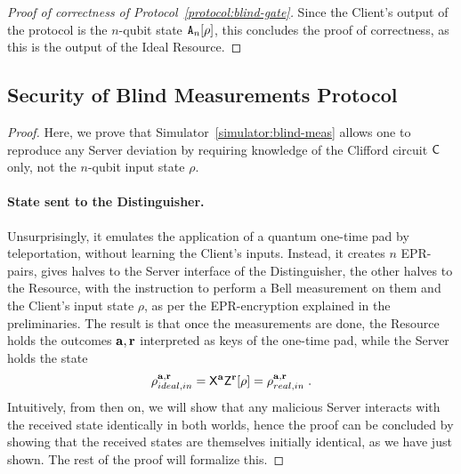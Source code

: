 \begin{proof}[Proof of correctness of Protocol~\ref{protocol:blind-gate}]
    Since the Client's output of the protocol is the $n$-qubit state $\mathtt{A}_n
        [\rho]$, this concludes the proof of correctness, as this is the output of the Ideal Resource.
\end{proof}

 \subsection{Security of Blind Measurements Protocol}
\label{section:blindmeas-secproof-formal}
\begin{proof} Here, we prove that Simulator~\ref{simulator:blind-meas} allows one to reproduce any Server deviation by requiring knowledge of the Clifford circuit $\mathsf{C}$ only, not the $n$-qubit input state $\rho$.
\paragraph{State sent to the Distinguisher.}
Unsurprisingly, it emulates the application of a quantum one-time pad by teleportation, without learning the Client's inputs. Instead, it creates $n$ EPR-pairs, gives halves to the Server interface of the Distinguisher, the other halves to the Resource, with the instruction to perform a Bell measurement on them and the Client's input state $\rho$, as per the EPR-encryption explained in the preliminaries. The result is that once the measurements are done, the Resource holds the outcomes $\mathbf a, \mathbf r$ interpreted as keys of the one-time pad, while the Server holds the state
\begin{equation}
    \rho^{\mathbf a, \mathbf r}_{ideal, in} = \mathsf{X}^{\mathbf a}\mathsf{Z}^{\mathbf r}[\rho] = \rho^{\mathbf a, \mathbf r}_{real, in}\; .
\end{equation}
Intuitively, from then on, we will show that any malicious Server interacts with the received state identically in both worlds, hence the proof can be concluded by showing that the received states are themselves initially identical, as we have just shown. The rest of the proof will formalize this.


\end{proof}
